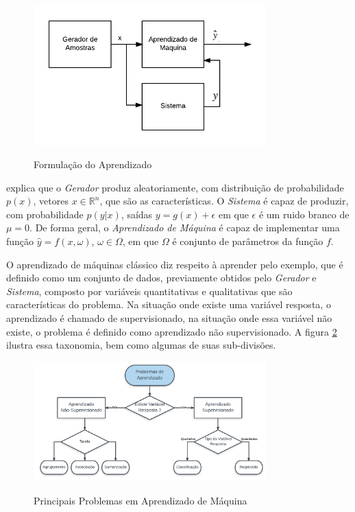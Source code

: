 \begin{figure}[!htb]
	\centering
	\caption{Formulação do Aprendizado} 
	\includegraphics[width=0.8\textwidth]{./04-figuras/MLForm.png}
	\label{fig:MLFormulation}
\end{figure}

 explica que o \textit{Gerador} produz aleatoriamente, com distribuição de probabilidade $p(x)$, vetores $x \in {\mathbb {R}} ^{n}$, que são as características. O \textit{Sistema} é capaz de produzir, com probabilidade $p(y | x)$, saídas $y = g(x) + \epsilon$ em que $\epsilon$ é um ruido branco de $\mu = 0$. De forma geral, o \textit{Aprendizado de Máquina} é capaz de implementar uma função $\hat{y} = f(x, \omega)$, $\omega \in \Omega$, em que $\Omega$ é conjunto de parâmetros da função $f$.

O aprendizado de máquinas clássico diz respeito à aprender pelo exemplo, que é definido como um conjunto de dados, previamente obtidos pelo \textit{Gerador} e \textit{Sistema}, composto por variáveis quantitativas e qualitativas que são características do problema. Na situação onde existe uma variável resposta, o aprendizado é chamado de supervisionado, na situação onde essa variável não existe, o problema é definido como aprendizado não supervisionado. A figura \ref{fig:MLProblems} ilustra essa taxonomia, bem como algumas de suas sub-divisões.


\begin{figure}[!htb]
	\centering
	\caption{Principais Problemas em Aprendizado de Máquina} 
	\includegraphics[width=0.8\textwidth]{./04-figuras/MLProblems.png}
	\label{fig:MLProblems}
\end{figure}
